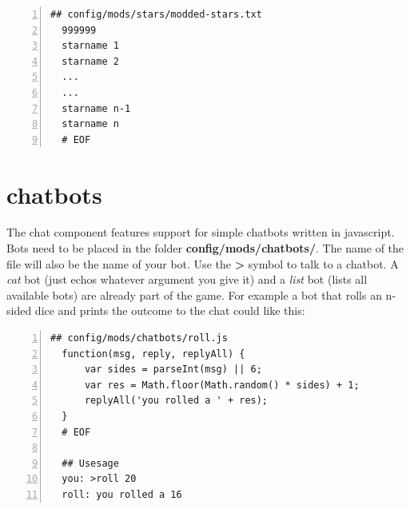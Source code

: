 \begin{Verbatim}[numbers=left,xleftmargin=6mm]
  ## config/mods/stars/modded-stars.txt
  999999
  starname 1
  starname 2
  ...
  ...
  starname n-1
  starname n
  # EOF
\end{Verbatim}

\section*{chatbots}
The chat component features support for simple chatbots written in javascript. Bots need to be placed in the folder \textbf{config/mods/chatbots/}. The name of the file will also be the name of your bot. Use the \textbf{>} symbol to talk to a chatbot. A \emph{cat} bot (just echos whatever argument you give it) and a \emph{list} bot (lists all available bots) are already part of the game. For example a bot that rolls an n-sided dice and prints the outcome to the chat could like this:

\begin{Verbatim}[numbers=left,xleftmargin=6mm]
  ## config/mods/chatbots/roll.js
  function(msg, reply, replyAll) {
      var sides = parseInt(msg) || 6;
      var res = Math.floor(Math.random() * sides) + 1;
      replyAll('you rolled a ' + res);
  }
  # EOF

  ## Usesage
  you: >roll 20
  roll: you rolled a 16
\end{Verbatim}